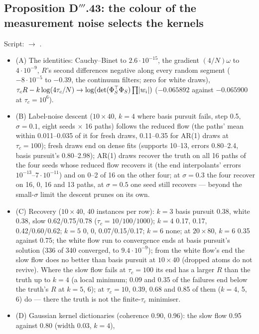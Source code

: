 \subsection{Proposition D\texorpdfstring{$'''$}{'''}.43: the colour of the measurement noise selects the kernels}

Script:  $\to$ .
\begin{itemize}
  \item (A) The identities: Cauchy--Binet to $2.6\cdot10^{-15}$, the gradient $(4/N)\omega$ to $4\cdot10^{-9}$, $R$'s
    second differences negative along every random segment ($-8\cdot10^{-5}$ to $-0.39$, the continuum filters; zero for
    white draws), $\tau_cR - k\log(4\tau_c/N)\to\log(\det(\Phi_S^\top\Phi_S)\prod\lvert w_i\rvert)$ ($-0.065892$ against
    $-0.065900$ at $\tau_c = 10^6$).
  \item (B) Label-noise descent ($10\times40$, $k = 4$ where basis pursuit fails, step 0.5, $\sigma = 0.1$, eight seeds
    $\times$ 16 paths) follows the reduced flow (the paths' mean within 0.011--0.035 of it for fresh draws, 0.11--0.35
    for AR(1) draws at $\tau_c = 100$); fresh draws end on dense fits (supports 10--13, errors 0.80--2.4, basis pursuit's
    0.80--2.98); AR(1) draws recover the truth on all 16 paths of the four seeds whose reduced flow recovers it (the end
    interpolants' errors $10^{-13}$--$7\cdot10^{-11}$) and on 0--2 of 16 on the other four; at $\sigma = 0.3$ the four
    recover on 16, 0, 16 and 13 paths, at $\sigma = 0.5$ one seed still recovers --- beyond the small-$\sigma$ limit the
    descent prunes on its own.
  \item (C) Recovery ($10\times40$, 40 instances per row): $k = 3$ basis pursuit 0.38, white 0.38, slow 0.62/0.75/0.78
    ($\tau_c = 10/100/1000$); $k = 4$ 0.17, 0.17, 0.42/0.60/0.62; $k = 5$ 0, 0, 0.07/0.15/0.17; $k = 6$ none; at
    $20\times80$, $k = 6$ 0.35 against 0.75; the white flow run to convergence ends at basis pursuit's solution (336 of
    340 converged, to $9.4\cdot10^{-9}$); from the white flow's end the slow flow does no better than basis pursuit at
    $10\times40$ (dropped atoms do not revive). Where the slow flow fails at $\tau_c = 100$ its end has a larger $R$ than
    the truth up to $k = 4$ (a local minimum; 0.09 and 0.35 of the failures end below the truth's $R$ at $k = 5$, 6); at
    $\tau_c = 10$, 0.39, 0.68 and 0.85 of them ($k = 4$, 5, 6) do --- there the truth is not the finite-$\tau_c$
    minimiser.
  \item (D) Gaussian kernel dictionaries (coherence 0.90, 0.96): the slow flow 0.95 against 0.80 (width 0.03, $k = 4$),

\end{itemize}
